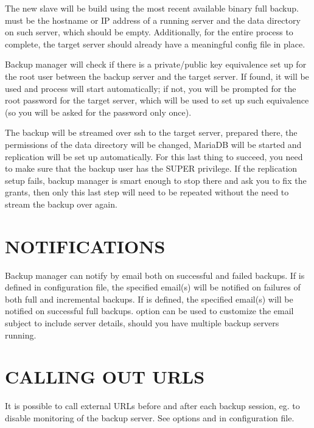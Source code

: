 \documentclass[letterpaper,10pt,english]{sphinxmanual}
\begin{document}
\sphinxAtStartPar
{}

\sphinxAtStartPar
The new slave will be build using the most recent available binary full backup.
 must be the hostname or IP address of a running server and 
the data directory on such server, which should be empty. Additionally, for the entire
process to complete, the target server should already have a meaningful config file in place.

\sphinxAtStartPar
Backup manager will check if there is a private/public key equivalence set up for the root
user between the backup server and the target server. If found, it will be used and process
will start automatically; if not, you will be prompted for the root password for the target
server, which will be used to set up such equivalence (so you will be asked for the password
only once).

\sphinxAtStartPar
The backup will be streamed over ssh to the target server, prepared there, the permissions of
the data directory will be changed, MariaDB will be started and replication will be set up
automatically. For this last thing to succeed, you need to make sure that the backup user
has the SUPER privilege.  If the replication setup fails, backup manager is smart enough to
stop there and ask you to fix the grants, then only this last step will need to be repeated
without the need to stream the backup over again.


\section{NOTIFICATIONS}
\label{\detokenize{mariadb-backup-manager:notifications}}
\sphinxAtStartPar
Backup manager can notify by email both on successful and failed backups.
If  is defined in configuration file, the specified email(s) will be
notified on failures of both full and incremental backups.  If  is defined,
the specified email(s) will be notified on successful full backups.
 option can be used to customize the email subject to include server details,
should you have multiple backup servers running.


\section{CALLING OUT URLS}
\label{\detokenize{mariadb-backup-manager:calling-out-urls}}
\sphinxAtStartPar
It is possible to call external URLs before and after each backup session, eg. to disable
monitoring of the backup server. See options  and 
in configuration file.
\end{document}
